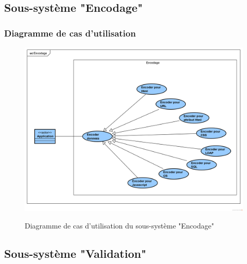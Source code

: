 \subsection{Sous-système "Encodage"}
\subsubsection{Diagramme de cas d'utilisation}
\begin{figure}[H]
	\centering
	\begin{minipage}{12cm}
		\centering
		{\includegraphics[height=0.35\textheight, width=1\textwidth]{fig/Encodage-use-case-diagram.png}}
	\end{minipage}
	\caption{Diagramme de cas d'utilisation du sous-système "Encodage"}
	\label{fig:7.15}
\end{figure}

\subsection{Sous-système "Validation"}
